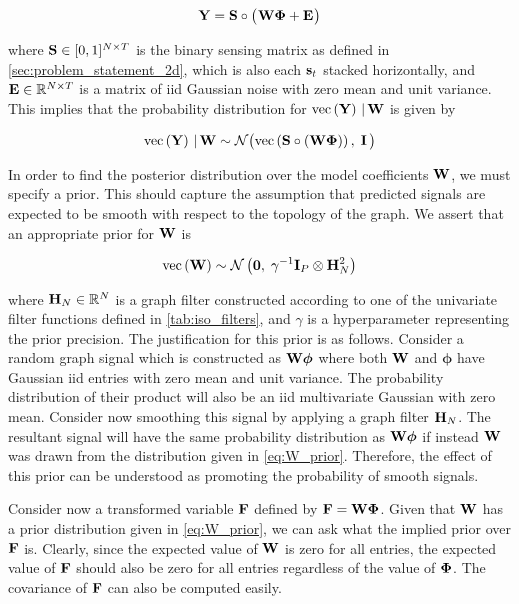 \begin{equation}
    \mathbf{Y} = \mathbf{S} \circ \big( \mspace{1mu} \mathbf{W} \mathbf{\Phi} + \mathbf{E} \mspace{1mu} \big)
\end{equation}

where $\mathbf{S} \in [0, 1]^{N \times T}$ is the binary sensing matrix as defined in \cref{sec:problem_statement_2d}, which is also each $\mathbf{s}_t$ stacked horizontally, and $\mathbf{E} \in \mathbb{R}^{N \times T}$ is a matrix of iid Gaussian noise with zero mean and unit variance. This implies that the probability distribution for $\text{\textup{vec}}\left(\mathbf{Y}\right) \, | \, \mathbf{W}$ is given by 

\begin{equation}
    \text{\textup{vec}}\left(\mathbf{Y}\right) \, | \, \mathbf{W} \sim \mathcal{N}\big( \text{\textup{vec}}\left(\mathbf{S} \circ (\mathbf{W} \mathbf{\Phi})\right), \; \mathbf{I} \, \big)
\end{equation}

In order to find the posterior distribution over the model coefficients $\mathbf{W}$, we must specify a prior. This should capture the assumption that predicted signals are expected to be smooth with respect to the topology of the graph. We assert that an appropriate prior for $\mathbf{W}$ is 

\begin{equation}
    \label{eq:W_prior}
    \text{\textup{vec}}\left(\mathbf{W}\right) \sim \mathcal{N}\left(\mathbf{0}, \; \gamma^{-1} \mathbf{I}_P \otimes \mathbf{H}_N^{2}\right)
\end{equation}

where $\mathbf{H}_N \in \mathbb{R}^{N}$ is a graph filter constructed according to one of the univariate filter functions defined in \cref{tab:iso_filters}, and $\gamma$ is a hyperparameter representing the prior precision. The justification for this prior is as follows. Consider a random graph signal which is constructed as $\mathbf{W} \boldsymbol{\phi}$ where both $\mathbf{W}$ and $\boldsymbol{\phi}$ have Gaussian iid entries with zero mean and unit variance. The probability distribution of their product will also be an iid multivariate Gaussian with zero mean. Consider now smoothing this signal by applying a graph filter $\mathbf{H}_N$. The resultant signal will have the same probability distribution as $\mathbf{W} \boldsymbol{\phi}$ if instead $\mathbf{W}$ was drawn from the distribution given in \cref{eq:W_prior}. Therefore, the effect of this prior can be understood as promoting the probability of smooth signals. 


Consider now a transformed variable $\mathbf{F}$ defined by $\mathbf{F} = \mathbf{W} \mathbf{\Phi}$. Given that $\mathbf{W}$ has a prior distribution given in \cref{eq:W_prior}, we can ask what the implied prior over $\mathbf{F}$ is. Clearly, since the expected value of $\mathbf{W}$ is zero for all entries, the expected value of $\mathbf{F}$ should also be zero for all entries regardless of the value of $\mathbf{\Phi}$. The covariance of $\mathbf{F}$ can also be computed easily. 

